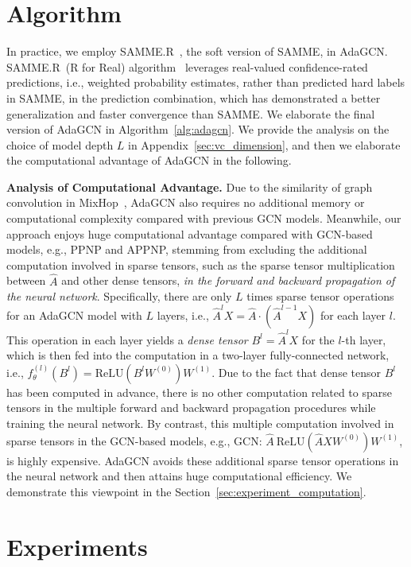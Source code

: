 \documentclass{article} \usepackage{iclr2021_conference,times}
\begin{document}
\section{Algorithm}\label{alg:algorithm_AdaGCN}
In practice, we employ SAMME.R~\citep{hastie2009multi}, the soft version of SAMME, in AdaGCN. SAMME.R~(R for Real) algorithm~\citep{hastie2009multi} leverages real-valued confidence-rated predictions, i.e., weighted probability estimates, rather than predicted hard labels in SAMME,  in the prediction combination, which has demonstrated a better generalization and faster convergence than SAMME. We elaborate the final version of AdaGCN in Algorithm~\ref{alg:adagcn}. We provide the analysis on the choice of model depth $L$ in Appendix~\ref{sec:vc_dimension}, and then we elaborate the computational advantage of AdaGCN in the following.

\textbf{Analysis of Computational Advantage.} Due to the similarity of graph convolution in MixHop~\citep{abu2019mixhop}, AdaGCN also requires no additional memory or computational complexity compared with previous GCN models. Meanwhile, our approach enjoys huge computational advantage compared with GCN-based models, e.g., PPNP and APPNP,  stemming from excluding the additional computation involved in sparse tensors, such as the sparse tensor multiplication between $\hat{A}$ and other dense tensors, \textit{in the forward and backward propagation of the neural network}. Specifically, there are only $L$ times sparse tensor operations for an AdaGCN model with $L$ layers, i.e., $\hat{A}^{l}X=\hat{A} \cdot (\hat{A}^{l-1}X)$ for each layer $l$. This operation in each layer yields a \textit{dense tensor} $B^{l} = \hat{A}^{l}X$ for the $l$-th layer, which is then fed into the computation in a two-layer fully-connected network, i.e., $f_{\theta}^{(l)}(B^{l})=\text{ReLU}(B^{l} W^{(0)})W^{(1)}$. Due to the fact that dense tensor $B^{l}$ has been computed in advance, there is no other computation related to sparse tensors in the multiple forward and backward propagation procedures while training the neural network. By contrast, this multiple computation involved in sparse tensors in the GCN-based models, e.g., GCN: $\hat{A} \ \text{ReLU}(\hat{A}XW^{(0)}) W^{(1)}$, is highly expensive. AdaGCN avoids these additional sparse tensor operations in the neural network and then attains huge computational efficiency. We demonstrate this viewpoint in the Section~\ref{sec:experiment_computation}.

\section{Experiments}
\end{document}
